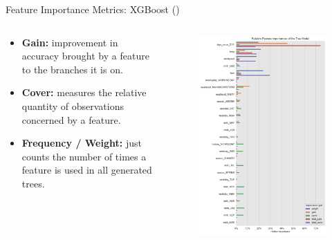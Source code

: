 \documentclass[10pt]{beamer}
\begin{document}
\begin{frame}{Feature Importance Metrics: XGBoost (\cite{xgboost})}

\begin{columns}
\begin{column}{0.4\textwidth}
  \begin{itemize}
  \item {\bf Gain:} improvement in accuracy brought by a feature to the branches it is on.
  \item {\bf Cover:} measures the relative quantity of observations concerned by a feature.
  \item {\bf Frequency / Weight:} just counts the number of times a feature is used in all generated trees.
  \end{itemize}
\end{column}
\begin{column}{0.6\textwidth}
\begin{center}
  \begin{figure}
    \includegraphics[scale=0.25]{images/interpretable_ml_81_0.png}
  \end{figure}
\end{center}
\end{column}
\end{columns}
\end{frame}
\end{document}
